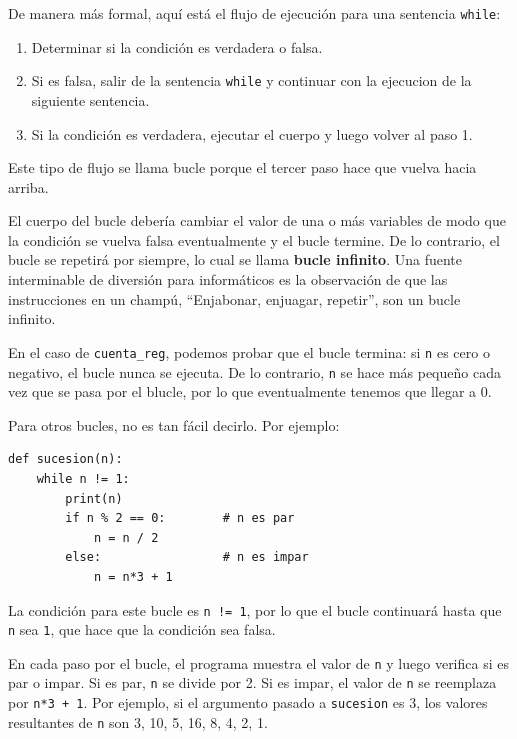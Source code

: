 \documentclass[10pt]{book}
\begin{document}
De manera más formal, aquí está el flujo de ejecución para una sentencia {\tt while}:

\begin{enumerate}

\item Determinar si la condición es verdadera o falsa.

\item Si es falsa, salir de la sentencia {\tt while}
y continuar con la ejecucion de la siguiente sentencia.

\item Si la condición es verdadera, ejecutar el
cuerpo y luego volver al paso 1.

\end{enumerate}

Este tipo de flujo se llama bucle porque el tercer paso
hace que vuelva hacia arriba.

El cuerpo del bucle debería cambiar el valor de una o más variables
de modo que la condición se vuelva falsa eventualmente y el bucle
termine.  De lo contrario, el bucle se repetirá por siempre, lo cual se llama
{\bf bucle infinito}.  Una fuente interminable de diversión para
informáticos es la observación de que las instrucciones en un champú,
``Enjabonar, enjuagar, repetir'', son un bucle infinito.

En el caso de {\tt cuenta\_reg}, podemos probar que el bucle
termina: si {\tt n} es cero o negativo, el bucle nunca se ejecuta.
De lo contrario, {\tt n} se hace más pequeño cada vez que se pasa por
el blucle, por lo que eventualmente tenemos que llegar a 0.

Para otros bucles, no es tan fácil decirlo.  Por ejemplo:

\begin{verbatim}
def sucesion(n):
    while n != 1:
        print(n)
        if n % 2 == 0:        # n es par
            n = n / 2
        else:                 # n es impar
            n = n*3 + 1
\end{verbatim}
%
La condición para este bucle es {\tt n != 1}, por lo que el bucle continuará
hasta que {\tt n} sea {\tt 1}, que hace que la condición sea falsa.

En cada paso por el bucle, el programa muestra el valor de {\tt n}
y luego verifica si es par o impar.  Si es par, {\tt n} se
divide por 2.  Si es impar, el valor de {\tt n} se reemplaza por
{\tt n*3 + 1}. Por ejemplo, si el argumento pasado a {\tt sucesion}
es 3, los valores resultantes de {\tt n} son 3, 10, 5, 16, 8, 4, 2, 1.
\end{document}
